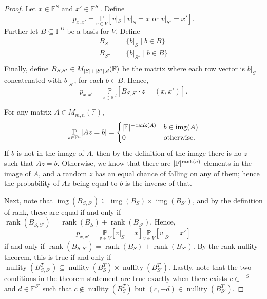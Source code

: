 \documentclass[english,12pt]{reedthesis}
\theoremstyle{plain}
\theoremstyle{definition}
\theoremstyle{remark}
\DeclareMathOperator{\img}{img}
\DeclareMathOperator{\rk}{rank}
\DeclareMathOperator{\nul}{nullity}
\DeclarePairedDelimiter{\abs}{\lvert}{\rvert}
\begin{document}
\begin{proof}
  Let $x \in \mathbb{F}^{S}$ and $x' \in \mathbb{F}^{S'}$. Define
  \begin{equation}
    p_{x,x'} = \underset{v \in V}{\mathbb{P}}[v|_{S} \mid v|_{S} =  x \text{ or } v|_{S'} = x'].
  \end{equation}
  Further let $B \subseteq \mathbb{F}^{D}$ be a basis for $V$. Define
  \begin{align*}
    B_{S} &= \{b|_{S} \mid b \in B\} \\
    B_{S''} &= \{b|_{S''} \mid b \in B\} \\
  \end{align*}
  Finally, define $B_{S,S'} \in M_{\abs{S}+\abs{S'},d}(\mathbb{F})$ be the matrix
  where each row vector is $b|_{S}$ concatenated with $b|_{S'}$, for each
  $b \in B$. Hence,
  \begin{equation}
    p_{x,x'} = \underset{z \in \mathbb{F}^{d}}{\mathbb{P}}[B_{S,S'} \cdot z = (x, x')].
  \end{equation}

  For any matrix $A \in M_{m,n}(\mathbb{F})$,
  \begin{equation}
    \underset{z \in \mathbb{F}^{n}}{\mathbb{P}}[Az = b] =
    \begin{cases}
      \abs{\mathbb{F}}^{-\rk(A)} & b \in \img(A) \\
      0 & \text{otherwise}.
    \end{cases}
  \end{equation}
  If $b$ is not in the image of $A$, then by the definition of the image there
  is no $z$ such that $Az = b$. Otherwise, we know that there are
  $\abs{\mathbb{F}}^{\rk(a)}$ elements in the image of $A$, and a random $z$
  has an equal chance of falling on any of them; hence the probability of $Az$
  being equal to $b$ is the inverse of that.

  Next, note that $\img(B_{S,S'}) \subseteq \img(B_{S}) \times \img(B_{S'})$, and by the
  definition of rank, these are equal if and only if
  $\rk(B_{S,S'}) = \rk(B_{S}) + \rk(B_{S'})$. Hence,
  \begin{equation}
    p_{x,x'} = \underset{v \in V}{\mathbb{P}}[v|_{S} = x]\underset{v \in V}{\mathbb{P}}[v|_{S'} = x']
  \end{equation}
  if and only if $\rk(B_{S,S'}) = \rk(B_{S}) + \rk(B_{S'})$. By the rank-nullity
  theorem, this is true if and only if
  $\nul(B_{S,S'}^{T}) \subseteq \nul(B_{S}^{T}) \times \nul(B_{S'}^{T})$. Lastly, note that
  the two conditions in the theorem statement are true exactly when there exists
  $c \in \mathbb{F}^{S}$ and $d \in \mathbb{F}^{S'}$ such that $c \notin \nul(B_{S}^{T})$
  but $(c, -d) \in \nul(B_{S'}^{T})$.
\end{proof}
\end{document}

